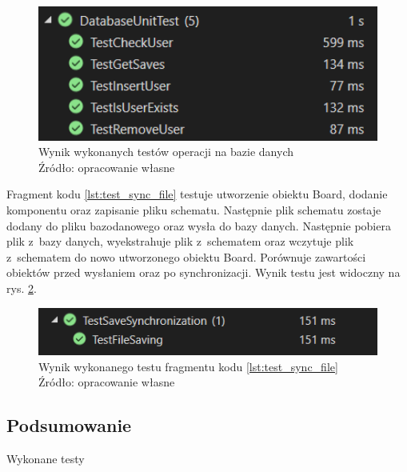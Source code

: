 \documentclass[12pt,a4paper]{article} %
\begin{document}
\begin{figure}[h]
	\centering
	\includegraphics[width=12cm]{images/test_db.png}
	\caption{Wynik wykonanych testów operacji na bazie danych\\ Źródło: opracowanie własne}
	\label{rys:test_db}
\end{figure} 

\aka Fragment kodu \ref{lst:test_sync_file} testuje utworzenie obiektu Board, dodanie komponentu oraz zapisanie pliku schematu. Następnie plik schematu zostaje dodany do pliku bazodanowego oraz wysła do bazy danych. Następnie pobiera plik z~bazy danych, wyekstrahuje plik z~schematem oraz wczytuje plik z~schematem do nowo utworzonego obiektu Board. Porównuje zawartości obiektów przed wysłaniem oraz po synchronizacji.
Wynik testu jest widoczny na rys. \ref{rys:test_sync_file}.



\begin{figure}[h]
	\centering
	\includegraphics[width=12cm]{images/test_sync_file.png}
	\caption{Wynik wykonanego testu fragmentu kodu \ref{lst:test_sync_file} \\ Źródło: opracowanie własne}
	\label{rys:test_sync_file}
\end{figure} 


\subsection{Podsumowanie}
\aka Wykonane testy 
\end{document}

